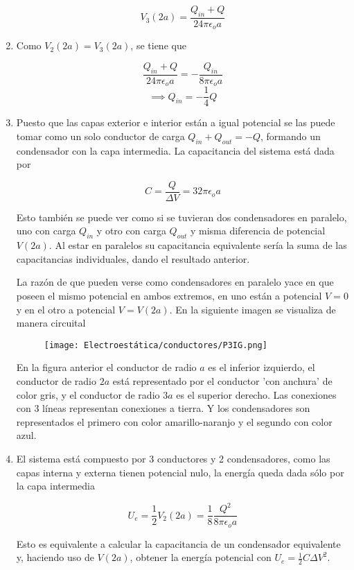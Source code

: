 \begin{enumerate}[label=\alph*)]
    \[V_3(2a) = \frac{Q_{in}+Q}{24\pi\epsilon_o a}\]
    \medbreak
    \item Como $V_2(2a)=V_3(2a)$, se tiene que

    \[\frac{Q_{in}+Q}{24\pi\epsilon_o a} = -\frac{Q_{in}}{8\pi\epsilon_o a}\]
    \[\implies Q_{in}=-\frac{1}{4}Q\]
    
    \medbreak
    \item Puesto que las capas exterior e interior están a igual potencial se las puede tomar como un solo conductor de carga $Q_{in} + Q_{out} = -Q$, formando un condensador con la capa intermedia. La capacitancia del sistema está dada por
    
    
    \[C = \frac{Q}{\Delta V} = 32\pi\epsilon_o a\]
    
    Esto también se puede ver como si se tuvieran dos condensadores en paralelo, uno con carga $Q_{in}$ y otro con carga $Q_{out}$ y misma diferencia de potencial $V(2a)$. Al estar en paralelos su capacitancia equivalente sería la suma de las capacitancias individuales, dando el resultado anterior.
    
    La razón de que pueden verse como condensadores en paralelo yace en que poseen el mismo potencial en ambos extremos, en uno están a potencial $V=0$ y en el otro a potencial $V = V(2a)$. En la siguiente imagen se visualiza de manera circuital
    
    \begin{figure}[H]
        \centering
        \texttt{[image: Electroestática/conductores/P3IG.png]}
    \end{figure}
    
    En la figura anterior el conductor de radio $a$ es el inferior izquierdo, el conductor de radio $2a$ está representado por el conductor 'con anchura' de color gris, y el conductor de radio $3a$ es el superior derecho. Las conexiones con 3 líneas representan conexiones a tierra. Y los condensadores son representados el primero con color amarillo-naranjo y el segundo con color azul. 
    
    \medbreak
    \item El sistema está compuesto por 3 conductores y 2 condensadores, como las capas interna y externa tienen potencial nulo, la energía queda dada sólo por la capa intermedia

    \[U_e = \frac{1}{2}V_2(2a) = \frac{1}{8}\frac{Q^2}{8\pi\epsilon_o a}\]
    
    Esto es equivalente a calcular la capacitancia de un condensador equivalente y, haciendo uso de $V(2a)$, obtener la energía potencial con
    $U_e = \frac{1}{2}C\Delta V^2$. 

\end{enumerate}
\bigbreak
\bigbreak
{}\newline

